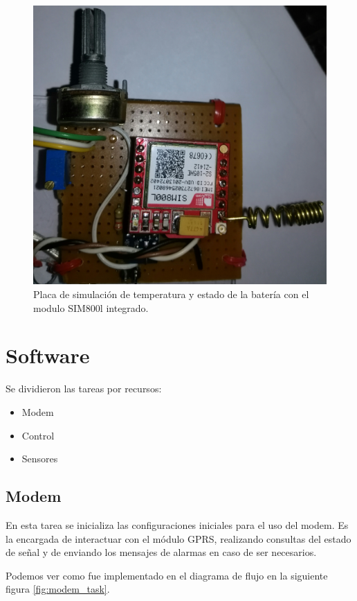 \begin{itemize}
\begin{figure}[!htb]
  \centering
  \includegraphics[scale=.03]{./Figures/placa_basica.jpg}
  \caption{Placa de simulación de temperatura y estado de la batería con el modulo SIM800l integrado.}
  \label{fig:placa_básicafirst}
\end{figure}


\section{Software}

Se dividieron las tareas por recursos:
\begin{itemize}
  \item Modem 
  \item Control
  \item Sensores
\end{itemize}

\subsection*{Modem}
En esta tarea se inicializa las configuraciones iniciales para el uso del modem. Es la encargada de interactuar con el módulo GPRS, realizando consultas del estado de señal y de enviando los mensajes de alarmas en caso de ser necesarios.

Podemos ver como fue implementado en el diagrama de flujo en la siguiente figura \ref{fig:modem_task}.


\end{itemize}
